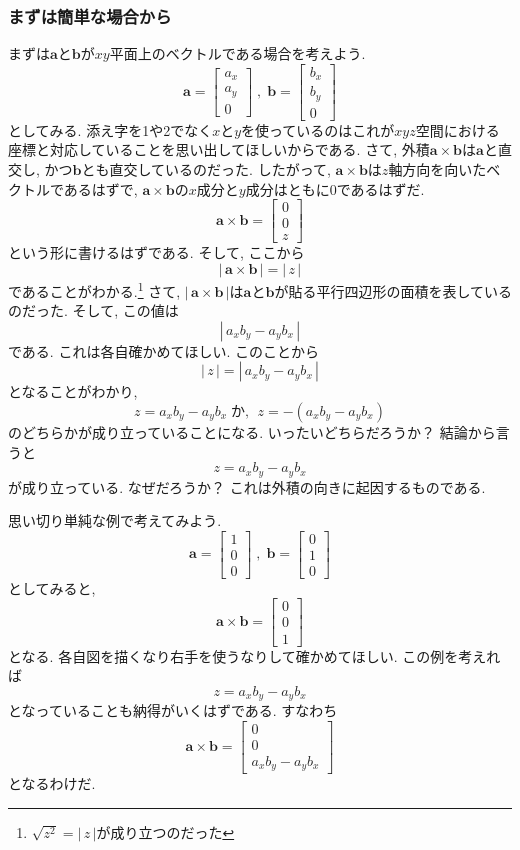 \subsubsection{まずは簡単な場合から}
まずは$\bm{a}$と$\bm{b}$が$xy$平面上のベクトルである場合を考えよう. 
$$
\bm{a} = \left[
 \begin{array}{c}
  a_x \\ 
  a_y \\
  0
 \end{array}
\right]
\; , \; 
\bm{b} = \left[
 \begin{array}{c}
  b_x \\ 
  b_y \\
  0
 \end{array}
\right]
$$
としてみる. 添え字を1や2でなく$x$と$y$を使っているのはこれが$xyz$空間における座標と対応していることを思い出してほしいからである. 
さて, 外積$\bm{a} \times \bm{b}$は$\bm{a}$と直交し, かつ$\bm{b}$とも直交しているのだった. 
したがって, $\bm{a} \times \bm{b}$は$z$軸方向を向いたベクトルであるはずで, 
$\bm{a} \times \bm{b}$の$x$成分と$y$成分はともに0であるはずだ. 
$$
\bm{a} \times \bm{b} = \left[
 \begin{array}{c}
  0 \\
  0 \\
  z
 \end{array}
\right]
$$
という形に書けるはずである. そして, ここから
$$
| \, \bm{a} \times \bm{b} \, |= | \, z \, |
$$
であることがわかる.\footnote{$\sqrt{z^2}=| \, z \, |$が成り立つのだった}
さて, $| \, \bm{a} \times \bm{b} \, |$は$\bm{a}$と$\bm{b}$が貼る平行四辺形の面積を表しているのだった. 
そして, この値は
$$
| \, a_x b_y - a_y b_x \, |
$$
である.  これは各自確かめてほしい. このことから
$$
| \, z \, | = | \, a_x b_y - a_y b_x \, |
$$
となることがわかり, 
$$
z = a_x b_y - a_y b_x \; \text{か, } \; z = - ( a_x b_y - a_y b_x )
$$
のどちらかが成り立っていることになる. いったいどちらだろうか？ 結論から言うと
$$
z = a_ x b_y - a_y b_x
$$
が成り立っている. なぜだろうか？ これは外積の向きに起因するものである. 

思い切り単純な例で考えてみよう. 
$$
\bm{a} = \left[
 \begin{array}{c}
  1 \\ 
  0 \\
  0
 \end{array}
\right]
\; , \; 
\bm{b} = \left[
 \begin{array}{c}
  0 \\ 
  1 \\
  0
 \end{array}
\right]
$$
としてみると, 
$$
\bm{a} \times \bm{b} = \left[
 \begin{array}{c}
  0 \\
  0 \\
  1
 \end{array}
\right]
$$
となる. 各自図を描くなり右手を使うなりして確かめてほしい. この例を考えれば
$$
z = a_x b_y - a_y b_x
$$
となっていることも納得がいくはずである. すなわち
$$
\bm{a} \times \bm{b} = \left[
 \begin{array}{c}
  0 \\
  0 \\
  a_x b_y - a_y b_x
 \end{array}
\right]
$$
となるわけだ. 

